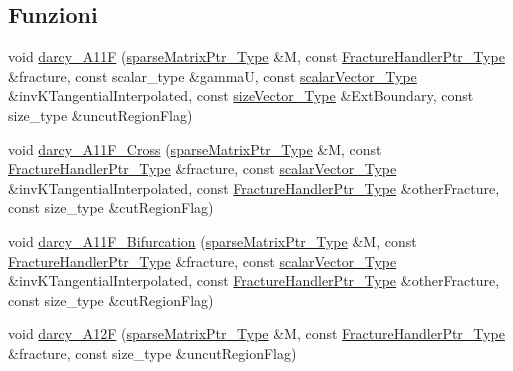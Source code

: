 \subsection*{Funzioni}
\begin{DoxyCompactItemize}
\item 
void \hyperlink{namespacegetfem_aba6f1b4f1d395aae3d96071cad4953a2}{darcy\-\_\-\-A11\-F} (\hyperlink{Core_8h_a87137a9501b38c724ac80bc955164bb7}{sparse\-Matrix\-Ptr\-\_\-\-Type} \&M, const \hyperlink{FractureHandler_8h_af23fb7a30aaff864bd42587af4f1e78a}{Fracture\-Handler\-Ptr\-\_\-\-Type} \&fracture, const scalar\-\_\-type \&gamma\-U, const \hyperlink{Core_8h_a4e75b5863535ba1dd79942de2846eff0}{scalar\-Vector\-\_\-\-Type} \&inv\-K\-Tangential\-Interpolated, const \hyperlink{Core_8h_a83c51913d041a5001e8683434c09857f}{size\-Vector\-\_\-\-Type} \&Ext\-Boundary, const size\-\_\-type \&uncut\-Region\-Flag)
\item 
void \hyperlink{namespacegetfem_a9b6ded8fe1019aa04e66d2047d0f29dd}{darcy\-\_\-\-A11\-F\-\_\-\-Cross} (\hyperlink{Core_8h_a87137a9501b38c724ac80bc955164bb7}{sparse\-Matrix\-Ptr\-\_\-\-Type} \&M, const \hyperlink{FractureHandler_8h_af23fb7a30aaff864bd42587af4f1e78a}{Fracture\-Handler\-Ptr\-\_\-\-Type} \&fracture, const \hyperlink{Core_8h_a4e75b5863535ba1dd79942de2846eff0}{scalar\-Vector\-\_\-\-Type} \&inv\-K\-Tangential\-Interpolated, const \hyperlink{FractureHandler_8h_af23fb7a30aaff864bd42587af4f1e78a}{Fracture\-Handler\-Ptr\-\_\-\-Type} \&other\-Fracture, const size\-\_\-type \&cut\-Region\-Flag)
\item 
void \hyperlink{namespacegetfem_a5e7b6fdaa0e505514d42982b3a33b69b}{darcy\-\_\-\-A11\-F\-\_\-\-Bifurcation} (\hyperlink{Core_8h_a87137a9501b38c724ac80bc955164bb7}{sparse\-Matrix\-Ptr\-\_\-\-Type} \&M, const \hyperlink{FractureHandler_8h_af23fb7a30aaff864bd42587af4f1e78a}{Fracture\-Handler\-Ptr\-\_\-\-Type} \&fracture, const \hyperlink{Core_8h_a4e75b5863535ba1dd79942de2846eff0}{scalar\-Vector\-\_\-\-Type} \&inv\-K\-Tangential\-Interpolated, const \hyperlink{FractureHandler_8h_af23fb7a30aaff864bd42587af4f1e78a}{Fracture\-Handler\-Ptr\-\_\-\-Type} \&other\-Fracture, const size\-\_\-type \&cut\-Region\-Flag)
\item 
void \hyperlink{namespacegetfem_ab62aa98cfcf55810e1518906202cbedc}{darcy\-\_\-\-A12\-F} (\hyperlink{Core_8h_a87137a9501b38c724ac80bc955164bb7}{sparse\-Matrix\-Ptr\-\_\-\-Type} \&M, const \hyperlink{FractureHandler_8h_af23fb7a30aaff864bd42587af4f1e78a}{Fracture\-Handler\-Ptr\-\_\-\-Type} \&fracture, const size\-\_\-type \&uncut\-Region\-Flag)

\end{DoxyCompactItemize}

